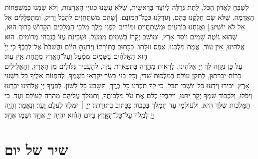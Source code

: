 \documentclass[twoside, openany, parskip=half, 11pt]{book}
\begin{document}
\uvaletzion

\\
\\


\label{end of shacharis}
\fullkaddish

\newcommand{\aleinu}{
\firstword{עָלֵֽינוּ}
לְשַׁבֵּחַ לַאֲדוֹן הַכֹּל, לָתֵת גְּדֻלָּה לְיוֹצֵר בְּרֵאשִׁית, שֶׁלֹּא עָשָׂנוּ כְּגוֹיֵי הָאֲרָצוֹת, וְלֹא שָׂמָנוּ כְּמִשְׁפְּחוֹת הָאֲדָמָה. שֶׁלֹּא שָׂם חֶלְקֵנוּ כָּהֶם, וְגוֹרָלֵנוּ כְּכׇל־הֲמוֹנָם. [שֶׁהֵם מִשְׁתַּחֲוִים לְהֶבֶל וָרִיק, וּמִתְפַּלֲּלִים אֶל אֵל לֹא יוֹשִׁיעַ.] וַאֲנַחְנוּ כּוֹרְעִים וּמִשְׁתַּחֲוִים וּמוֹדִים לִפְנֵי מֶלֶךְ מַלְכֵי הַמְּלָכִים הַקָּדוֹשׁ בָּרוּךְ הוּא, שֶׁהוּא נוֹטֶה שָׁמַיִם וְיֹסֵד אָרֶץ, וּמוֹשַׁב יְקָרוֹ בַּשָּׁמַיִם מִמַּעַל, וּשְׁכִינַת עֻזּוֹ בְּגׇבְהֵי מְרוֹמִים. הוּא אֱלֹהֵינוּ, אֵין עוֹד, אֱמֶת מַלְכֵּנוּ, אֶפֶס זוּלָתוֹ. כַּכָּתוּב בְּתּוֹרָתוֹ׃ וְיָדַעְתָּ֣
\source{דברים ד}
הַיּ֗וֹם וַהֲשֵׁבֹתָ֮ אֶל־לְבָבֶ֒ךָ֒ כִּ֤י יְיָ֙ ה֣וּא הָֽאֱלֹהִ֔ים בַּשָּׁמַ֣יִם מִמַּ֔עַל וְעַל־הָאָ֖רֶץ מִתָּ֑חַת אֵ֖ין עֽוֹד׃\\
עַל כֵּן נְקַוֶּה לְךָ יְיָ אֱלֹהֵינוּ, לִרְאוֹת מְהֵרָה בְּתִפְאֶרֶת עֻזֶּךָ, לְהַעֲבִיר גִּלּוּלִים מִן הָאָרֶץ, וְהָאֱלִילִים כָּרוֹת יִכָּרֵתוּן, לְתַקֵּן עוֹלָם בְּמַלְכוּת שַׁדַּי, וְכׇל־בְּנֵי בָשָׂר יִקְרְאוּ בִשְׁמֶךָ, לְהַפְנוֹת אֵלֶיךָ כָּל־רִשְׁעֵי אָרֶץ. יַכִּירוּ וְיֵדְעוּ כָּל־יוֹשְׁבֵי תֵבֵל, כִּי לְךָ תִכְרַע כָּל־בֶּרֶךְ, תִּשָּׁבַע כָּל־לָשׁוֹן. לְפָנֶיךָ יְיָ אֱלֹהֵינוּ יִכְרְעוּ וְיִפֹּלוּ, וְלִכְבוֹד שִׁמְךָ יְקָר יִתֵּנוּ, וִיקַבְּלוּ כֻלָּם אֶת־עֹל מַלְכוּתֶךָ, וְתִמְלֹךְ עֲלֵיהֶם מְהֵרָה לְעוֹלָם וָעֶד. כִּי הַמַּלְכוּת שֶׁלְּךָ הִיא, וּלְעוֹלְמֵי עַד תִּמְלֹךְ בְּכָבוֹד׃ כַּכָּתוּב בְּתוֹרָתֶךָ׃\source{שמות טו} יְיָ֥ ׀ יִמְלֹ֖ךְ לְעֹלָ֥ם וָעֶֽד׃ וְנֶאֱמַר׃\source{זכריה יד} וְהָיָ֧ה יְיָ֛ לְמֶ֖לֶךְ עַל־כׇּל־הָאָ֑רֶץ בַּיּ֣וֹם הַה֗וּא יִהְיֶ֧ה יְיָ֛ אֶחָ֖ד וּשְׁמ֥וֹ אֶחָֽד׃

}

\aleinu


\section[שיר של יום]{ שיר של יום }
\label{shir_shel_yom}
\newcommand{\shirshelyomintro}[1]{\begin{small}הַיּוֹם יוֹם #1 שֶׁבּוֹ הָיוּ הַלְוִיִּם אוֹמְרִים בְּבֵית־הַמִּקְדָּשׁ׃ \end{small}\vspace{-0.7\baselineskip}}
\end{document}
